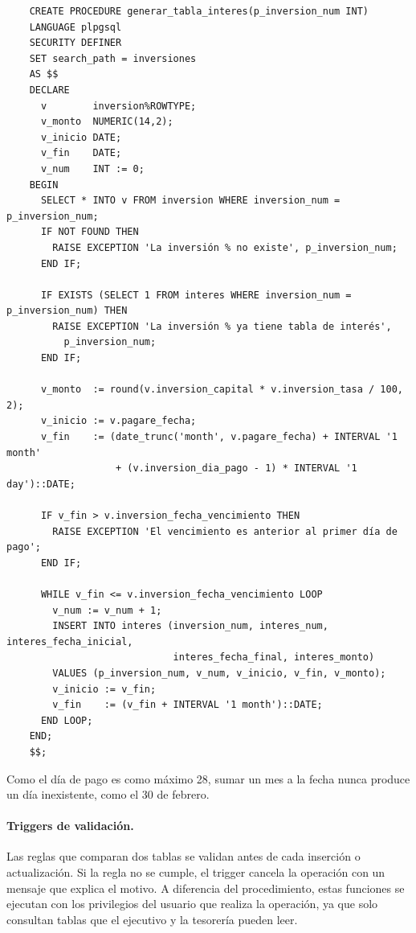 \begin{verbatim}
	CREATE PROCEDURE generar_tabla_interes(p_inversion_num INT)
	LANGUAGE plpgsql
	SECURITY DEFINER
	SET search_path = inversiones
	AS $$
	DECLARE
	  v        inversion%ROWTYPE;
	  v_monto  NUMERIC(14,2);
	  v_inicio DATE;
	  v_fin    DATE;
	  v_num    INT := 0;
	BEGIN
	  SELECT * INTO v FROM inversion WHERE inversion_num = p_inversion_num;
	  IF NOT FOUND THEN
	    RAISE EXCEPTION 'La inversión % no existe', p_inversion_num;
	  END IF;

	  IF EXISTS (SELECT 1 FROM interes WHERE inversion_num = p_inversion_num) THEN
	    RAISE EXCEPTION 'La inversión % ya tiene tabla de interés',
	      p_inversion_num;
	  END IF;

	  v_monto  := round(v.inversion_capital * v.inversion_tasa / 100, 2);
	  v_inicio := v.pagare_fecha;
	  v_fin    := (date_trunc('month', v.pagare_fecha) + INTERVAL '1 month'
	               + (v.inversion_dia_pago - 1) * INTERVAL '1 day')::DATE;

	  IF v_fin > v.inversion_fecha_vencimiento THEN
	    RAISE EXCEPTION 'El vencimiento es anterior al primer día de pago';
	  END IF;

	  WHILE v_fin <= v.inversion_fecha_vencimiento LOOP
	    v_num := v_num + 1;
	    INSERT INTO interes (inversion_num, interes_num, interes_fecha_inicial,
	                         interes_fecha_final, interes_monto)
	    VALUES (p_inversion_num, v_num, v_inicio, v_fin, v_monto);
	    v_inicio := v_fin;
	    v_fin    := (v_fin + INTERVAL '1 month')::DATE;
	  END LOOP;
	END;
	$$;
\end{verbatim}

Como el día de pago es como máximo 28, sumar un mes a la fecha nunca produce un día inexistente, como el 30 de febrero.

\paragraph{Triggers de validación.} Las reglas que comparan dos tablas se validan antes de cada inserción o actualización. Si la regla no se cumple, el trigger cancela la operación con un mensaje que explica el motivo. A diferencia del procedimiento, estas funciones se ejecutan con los privilegios del usuario que realiza la operación, ya que solo consultan tablas que el ejecutivo y la tesorería pueden leer.

